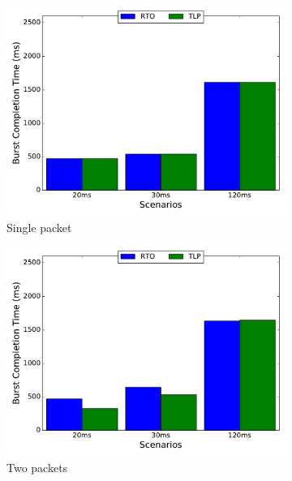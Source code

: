\documentclass[10pt,conference,compsoc]{IEEEtran}
\begin{document}
\begin{figure}[!tbp]
 \begin{subfigure}[b]{0.32\textwidth}
	\includegraphics[angle=0, width=\textwidth,natwidth=578.16,natheight=433.62]{plots/T1P.pdf}
	\caption{Single packet}\label{t1p}
 \end{subfigure}
 \hfill
 \begin{subfigure}[b]{0.32\textwidth}
	\includegraphics[angle=0, width=\textwidth,natwidth=578.16,natheight=433.62]{plots/T2P.pdf}
	\caption{Two packets }\label{t2p}
 \end{subfigure}
 \hfill
 \begin{subfigure}[b]{0.32\textwidth}

\end{subfigure}
\end{figure}
\end{document}
